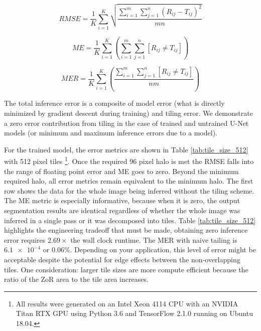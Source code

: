 \documentclass[10pt, indentfirst]{article}
\begin{document}
\begin{equation}
RMSE = \frac{1}{K} \sum_{i=1}^{K} \sqrt{ \frac{\sum_{i = 1}^{m} \sum_{j = 1}^{n} (R_{ij} - T_{ij})^2}{mn}}
\label{eq:rmse}
\end{equation}

\begin{equation}
ME = \frac{1}{K} \sum_{i=1}^{K} \left( \sum_{i = 1}^{m} \sum_{j = 1}^{n} [ R_{ij} \neq T_{ij} ] \right) 
\label{eq:me}
\end{equation}

\begin{equation}
MER = \frac{1}{K} \sum_{i=1}^{K} \left( \frac{\sum_{i = 1}^{m} \sum_{j = 1}^{n} [ R_{ij} \neq T_{ij} ]}{nm} \right) 
\label{eq:mer}
\end{equation}

The total inference error is a composite of model error (what is directly minimized by gradient descent during training) and tiling error. We demonstrate a zero error contribution from tiling in the case of trained and untrained U-Net models (or minimum and maximum inference errors due to a model).

For the trained model, the error metrics are shown in Table \ref{tab:tile_size_512} with 512 pixel tiles \footnote{All results were generated on an Intel Xeon 4114 CPU with an NVIDIA Titan RTX GPU using Python 3.6 and TensorFlow 2.1.0 running on Ubuntu 18.04.}.
Once the required 96 pixel halo is met the RMSE falls into the range of floating point error and ME goes to zero. Beyond the minimum required halo, all error metrics remain equivalent to the minimum halo. The first row shows the data for the whole image being inferred without the tiling scheme. 
The ME metric is especially informative, because when it is zero, the output segmentation results are identical regardless of whether the whole image was inferred in a single pass or it was decomposed into tiles. Table \ref{tab:tile_size_512} highlights the engineering tradeoff that must be made, obtaining zero inference error requires $2.69 \times$ the wall clock runtime. 
The MER with naive tailing is $\num{6.1e-4}$ or $\num{0.06} \%$. Depending on your application, this level of error might be acceptable despite the potential for edge effects between the non-overlapping tiles. One consideration: larger tile sizes are more compute efficient because the ratio of the ZoR area to the tile area increases. 
\end{document}
